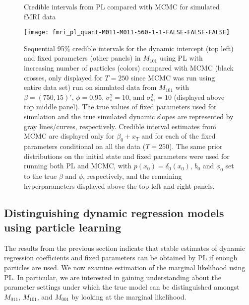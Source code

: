 \begin{figure}
\ssp
\centering
\caption{Credible intervals from PL compared with MCMC for simulated fMRI data} \label{fig:fmri:quant:M101}
\texttt{[image: fmri\_pl\_quant-M011-M011-560-1-1-FALSE-FALSE-FALSE]}
\caption*{Sequential 95\% credible intervals for the dynamic intercept (top left) and fixed parameters (other panels) in $M_{101}$ using PL with increasing number of particles (colors) compared with MCMC (black crosses, only displayed for $T = 250$ since MCMC was run using entire data set) run on simulated data from $M_{101}$ with $\beta = (750,15)'$, $\phi = 0.95$, $\sigma^2_s = 10$, and $\sigma^2_m = 10$ (displayed above top middle panel). The true values of fixed parameters used for simulation and the true simulated dynamic slopes are represented by gray lines/curves, respectively. Credible interval estimates from MCMC are displayed only for $\beta_0 + x_T$ and for each of the fixed parameters conditional on all the data ($T = 250$). The same prior distributions on the initial state and fixed parameters were used for running both PL and MCMC, with $p(x_0) = \delta_{0}(x_0)$, $b_0$ and $\phi_0$ set to the true $\beta$ and $\phi$, respectively, and the remaining hyperparameters displayed above the top left and right panels.}
\end{figure}

\subsection{Distinguishing dynamic regression models using particle learning \label{sec:fmri:dist}}

The results from the previous section indicate that stable estimates of dynamic regression coefficients and fixed parameters can be obtained by PL if enough particles are used. We now examine estimation of the marginal likelihood using PL. In particular, we are interested in gaining understanding about the parameter settings under which the true model can be distinguished amongst $M_{011}$, $M_{101}$, and $M_{001}$ by looking at the marginal likelihood.

